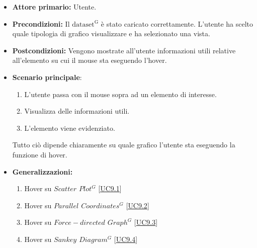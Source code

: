\begin{itemize}
    \item \textbf{Attore primario:} Utente.
    \item \textbf{Precondizioni:} Il ${\mathrm{dataset^{G}}}$ è stato caricato correttamente. L'utente ha scelto quale tipologia di grafico visualizzare e ha selezionato una vista.
    \item \textbf{Postcondizioni:} Vengono mostrate all'utente informazioni utili relative all'elemento su cui il mouse sta eseguendo l'hover.
    \item \textbf{Scenario principale}: 
    \begin{enumerate}
		\item L'utente passa con il mouse sopra ad un elemento di interesse. 
		\item Visualizza delle informazioni utili.
		\item L'elemento viene evidenziato. 
	\end{enumerate}
	Tutto ciò dipende chiaramente su quale grafico l'utente sta eseguendo la funzione di hover.
    \item \textbf{Generalizzazioni:} \begin{enumerate}
                                        \item Hover su \textit{$Scatter$ $Plot^{G}$} [\hyperref[sec:UC9.1]{UC9.1}]
                                        \item Hover su \textit{$Parallel$ $Coordinates^{G}$} [\hyperref[sec:UC9.2]{UC9.2}]
                                        \item Hover su \textit{$Force-directed$ $Graph^{G}$} [\hyperref[sec:UC9.3]{UC9.3}]
                                        \item Hover su \textit{$Sankey$ $Diagram^{G}$} [\hyperref[sec:UC9.4]{UC9.4}]
                                    \end{enumerate}
\end{itemize}

